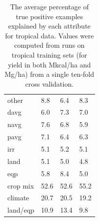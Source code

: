 \documentclass[12pt,twoside]{article}
\begin{document}
\begin{table}[h!]
{\begin{tabular}{llll}
other & 8.8 & 6.4 & 8.3 \\
davg & 6.0 & 7.3 & 7.0 \\
navg & 7.6 & 6.8 & 5.9 \\
pavg & 7.1 & 6.4 & 6.3 \\
irr & 5.1 & 5.2 & 5.1 \\
land & 5.1 & 5.0 & 4.8 \\
eqp & 5.8 & 8.4 & 5.0 \\
\midrule
crop mix & 52.6 & 52.6 & 55.2 \\
climate & 20.7 & 20.5 & 19.2 \\
land/eqp & 10.9 & 13.4 & 9.8 \\
\bottomrule
\end{tabular}
\label{t.ny.trop_percentages}
}
\captionsetup{width=.9\textwidth}
\caption[Percentage of Examples Explained by Attribute (Tropical Data)]{The average percentage of true positive examples explained by each attribute for tropical data. Values were computed from runs on tropical training sets (for yield in both Mkcal/ha and Mg/ha) from a single ten-fold cross validation.}
\label{tropical_percentages}
\end{table}
\end{document}
